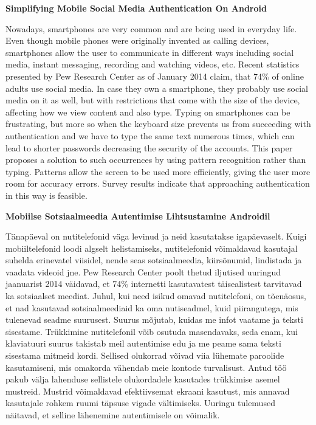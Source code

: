 \noindent\textbf{\large Simplifying Mobile Social Media Authentication On Android}
\vspace*{2ex}
{}

\noindent Nowadays, smartphones are very common and are being used in everyday life. Even though mobile phones were originally invented as calling devices, smartphones allow the user to communicate in different ways including social media, instant messaging, recording and watching videos, etc. Recent statistics presented by Pew Research Center as of January 2014 claim, that 74\% of online adults use social media. In case they own a smartphone, they probably use social media on it as well, but with restrictions that come with the size of the device, affecting how we view content and also type. Typing on smartphones can be frustrating, but more so when the keyboard size prevents us from succeeding with authentication and we have to type the same text numerous times, which can lead to shorter passwords decreasing the security of the accounts. This paper proposes a solution to such occurrences by using pattern recognition rather than typing. Patterns allow the screen to be used more efficiently, giving the user more room for accuracy errors. Survey results indicate that approaching authentication in this way is feasible.

\vspace*{2ex}

{}

\vspace*{3ex}

\noindent\textbf{\large Mobiilse Sotsiaalmeedia Autentimise Lihtsustamine Androidil}
\vspace*{2ex}
{}

\noindent T\"{a}nap\"{a}eval on nutitelefonid v\"{a}ga levinud ja neid kasutatakse igap\"{a}evaselt. Kuigi mobiiltelefonid loodi algselt helistamiseks, nutitelefonid v\~{o}imaldavad kasutajal suhelda erinevatel viisidel, nende seas sotsiaalmeedia, kiirs\~{o}numid, lindistada ja vaadata videoid jne. Pew Research Center poolt thetud iljutised uuringud jaanuarist 2014 v\"{a}idavad, et 74\% internetti kasutavatest t\"{a}isealistest tarvitavad ka sotsiaalset meediat. Juhul, kui need isikud omavad nutitelefoni, on t\~{o}en\"{a}osus, et nad kasutavad sotsiaalmeediaid ka oma nutiseadmel, kuid piirangutega, mis tulenevad seadme suurusest. Suurus m\~{o}jutab, kuidas me infot vaatame ja teksti sisestame. Tr\"{u}kkimine nutitelefonil v\~{o}ib osutuda masendavaks, seda enam, kui klaviatuuri suurus takistab meil autentimise edu ja me peame sama teksti sisestama mitmeid kordi. Sellised olukorrad v\~{o}ivad viia l\"{u}hemate paroolide kasutamiseni, mis omakorda v\"{a}hendab meie kontode turvalisust. Antud t\"{o}\"{o} pakub v\"{a}lja lahenduse sellistele olukordadele kasutades tr\"{u}kkimise asemel mustreid. Mustrid v\~{o}imaldavad efektiivsemat ekraani kasutust, mis annavad kasutajale rohkem ruumi t\"{a}psuse vigade v\"{a}ltimiseks. Uuringu tulemused n\"{a}itavad, et selline l\"{a}henemine autentimisele on v\~{o}imalik.

\vspace*{2ex}

{}
